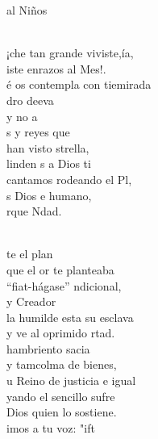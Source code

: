 \begin{cancion}
	al Niños  \\\jump\\
	\begin{chorus}%
	¡che tan grande viviste,ía, \\
	iste enrazos al Mes!.\\
	é os contempla con tiemirada\\
	dro deeva \\
	y no a   \\
	s y reyes que\\
	han visto strella,\\
	linden s a Dios ti\\
	 cantamos rodeando el Pl,\\
	s Dios e humano,  \\
	rque Ndad.\\
	\end{chorus}%
	\jump\\
	te el plan \\
	que el or te planteaba\\
	 “fiat-hágase” ndicional,\\
	y   Creador \\
	la humilde esta su esclava\\
	y ve al oprimido rtad.\\
	hambriento sacia \\
	y tamcolma de bienes,\\
	u Reino de justicia e igual\\
	yando el sencillo sufre \\
	Dios quien lo sostiene.\\
	imos a tu voz: "ift \\
\end{cancion}%
